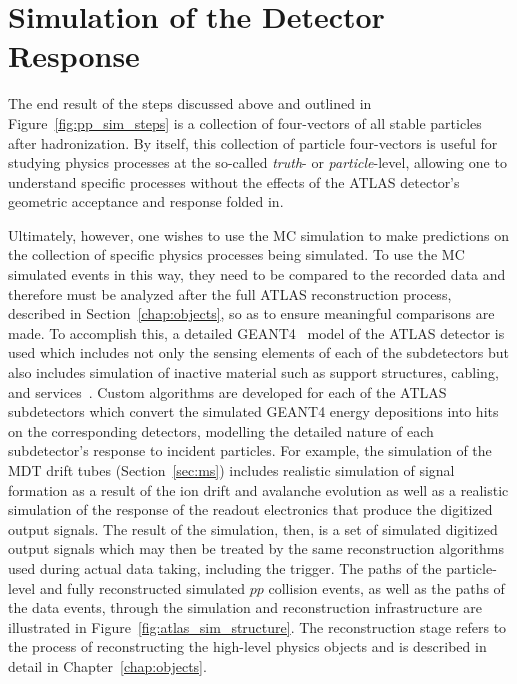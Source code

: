 %
%


\section{Simulation of the Detector Response}
\label{sec:detector_sim}

The end result of the steps discussed above and outlined in Figure~\ref{fig:pp_sim_steps}
is a collection of four-vectors of all stable particles after hadronization.
By itself, this collection of particle four-vectors is useful for studying physics processes at
the so-called \textit{truth}- or \textit{particle}-level, allowing one to understand specific
processes without the effects of the ATLAS detector's geometric acceptance and response folded in.

Ultimately, however, one wishes to use the MC simulation to make predictions on the collection of specific physics
processes being simulated.
To use the MC simulated events in this way, they need to be compared to the recorded data and therefore must be analyzed after
the full ATLAS reconstruction process, described in Section~\ref{chap:objects}, so as to ensure meaningful comparisons are made.
To accomplish this, a detailed \textsc{GEANT4}~\cite{GEANT4} model of the ATLAS detector is used
which includes not only the sensing elements of each of the subdetectors but also includes
simulation of inactive material such as support structures, cabling, and services~\cite{ATLASSim}.
Custom algorithms are developed for each of the ATLAS subdetectors which convert the simulated \textsc{GEANT4}
energy depositions into hits on the corresponding detectors, modelling the detailed nature
of each subdetector's response to incident particles.
For example, the simulation of the MDT drift tubes (Section~\ref{sec:ms}) includes realistic simulation of signal formation as a result of the ion
drift and avalanche evolution as well as a realistic simulation of the response
of the readout electronics that produce the digitized output signals.
The result of the simulation, then, is a set of simulated digitized output signals which
may then be treated by the same reconstruction algorithms used during actual data taking, including the trigger.
The paths of the particle-level and fully reconstructed simulated $pp$ collision events, as well
as the paths of the data events, through the simulation and reconstruction infrastructure are illustrated in Figure~\ref{fig:atlas_sim_structure}.
The reconstruction stage refers to the process of reconstructing the high-level physics objects
and is described in detail in Chapter~\ref{chap:objects}.

